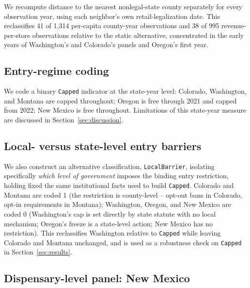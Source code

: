 \documentclass[12pt]{article}
\begin{document}
We recompute distance to the nearest nonlegal-state county separately for every observation year, using each
neighbor's own retail-legalization date. This reclassifies 41 of 1,314 per-capita county-year observations and
38 of 995 revenue-per-store observations relative to the static alternative, concentrated in the early years
of Washington's and Colorado's panels and Oregon's first year.

\subsection{Entry-regime coding}

We code a binary \texttt{Capped} indicator at the state-year level: Colorado, Washington, and Montana are
capped throughout; Oregon is free through 2021 and capped from 2022; New Mexico is free throughout. Limitations
of this state-year measure are discussed in Section~\ref{sec:discussion}.

\subsection{Local- versus state-level entry barriers}
\label{sec:localbarrier}

We also construct an alternative classification, \texttt{LocalBarrier}, isolating specifically \emph{which
level of government} imposes the binding entry restriction, holding fixed the same institutional facts used to
build \texttt{Capped}. Colorado and Montana are coded 1 (the restriction is county-level -- opt-out bans in
Colorado, opt-in requirements in Montana); Washington, Oregon, and New Mexico are coded 0 (Washington's cap is
set directly by state statute with no local mechanism; Oregon's freeze is a state-level action; New Mexico has
no restriction). This reclassifies Washington relative to \texttt{Capped} while leaving Colorado and Montana
unchanged, and is used as a robustness check on \texttt{Capped} in Section~\ref{sec:results}.

\subsection{Dispensary-level panel: New Mexico}
\label{sec:nmdispensary}
\end{document}
